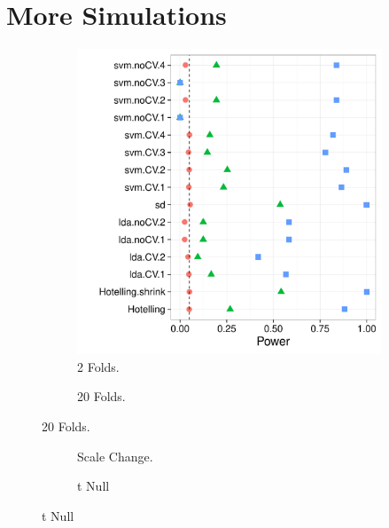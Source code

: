 \documentclass[12pt,a4paper]{article}
\begin{document}
\newpage

\section{More Simulations}


\begin{figure}[h]
\centering
\label{fig:simulation_1}
\caption{\footnotesize [TODO].}	
	\begin{subfigure}{.5\textwidth}
	  \centering
	  \includegraphics[width=1\linewidth]{"art/2016-07-27 21:21:12"}
	  \caption{2 Folds.}  %
	\label{fig:2016-07-2721:21:12}
	\end{subfigure}%
	\begin{subfigure}{.5\textwidth}
	  \centering
	  \caption{20 Folds.} %
	\end{subfigure}
\end{figure}


\begin{figure}[h]
\centering
\caption{\footnotesize [TODO].}	
	\begin{subfigure}{.5\textwidth}
	  \centering
	  \caption{Scale Change.}  %
	\end{subfigure}%
	\begin{subfigure}{.5\textwidth}
	  \centering
	  \caption{t Null} %
	\end{subfigure}
\end{figure}
\end{document}
